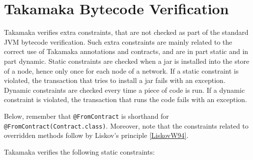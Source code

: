 \documentclass[a4paper,]{book}
\begin{document}
{\hypertarget{takamaka-bytecode-verification}{%
\section{Takamaka Bytecode Verification
}\label{takamaka-bytecode-verification}}

Takamaka verifies extra constraints, that are not checked as part of the
standard JVM bytecode verification. Such extra constraints are mainly
related to the correct use of Takamaka annotations and contracts, and
are in part static and in part dynamic. Static constraints are checked
when a jar is installed into the store of a node, hence only once for
each node of a network. If a static constraint is violated, the
transaction that tries to install a jar fails with an exception. Dynamic
constraints are checked every time a piece of code is run. If a dynamic
constraint is violated, the transaction that runs the code fails with an
exception.

Below, remember that \texttt{@FromContract} is shorthand for
\texttt{@FromContract(Contract.class)}. Moreover, note that the
constraints related to overridden methods follow by Liskov's principle
\protect\hyperlink{LiskovW94}{{[}LiskovW94{]}}.

Takamaka verifies the following static constraints:

}
\end{document}
